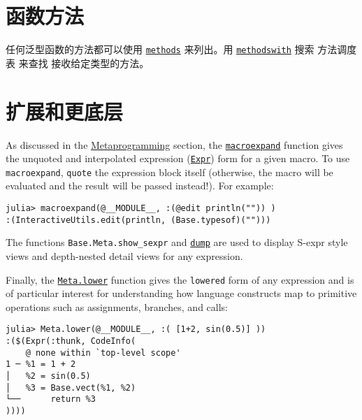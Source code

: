 \hypertarget{15829703883389410283}{}


\section{函数方法}



任何泛型函数的方法都可以使用 \hyperlink{3025953302266245919}{\texttt{methods}} 来列出。用 \hyperlink{1845157398882896709}{\texttt{methodswith}} 搜索 方法调度表 来查找 接收给定类型的方法。



\hypertarget{12369440035598215363}{}


\section{扩展和更底层}



As discussed in the \href{@ref}{Metaprogramming} section, the \hyperlink{8018172489611994488}{\texttt{macroexpand}} function gives the unquoted and interpolated expression (\hyperlink{17120496304147995299}{\texttt{Expr}}) form for a given macro. To use \texttt{macroexpand}, \texttt{quote} the expression block itself (otherwise, the macro will be evaluated and the result will be passed instead!). For example:




\begin{verbatim}
julia> macroexpand(@__MODULE__, :(@edit println("")) )
:(InteractiveUtils.edit(println, (Base.typesof)("")))
\end{verbatim}



The functions \texttt{Base.Meta.show\_sexpr} and \hyperlink{15981569052160951906}{\texttt{dump}} are used to display S-expr style views and depth-nested detail views for any expression.



Finally, the \hyperlink{6644553029841096787}{\texttt{Meta.lower}} function gives the \texttt{lowered} form of any expression and is of particular interest for understanding how language constructs map to primitive operations such as assignments, branches, and calls:




\begin{verbatim}
julia> Meta.lower(@__MODULE__, :( [1+2, sin(0.5)] ))
:($(Expr(:thunk, CodeInfo(
    @ none within `top-level scope'
1 ─ %1 = 1 + 2
│   %2 = sin(0.5)
│   %3 = Base.vect(%1, %2)
└──      return %3
))))
\end{verbatim}



